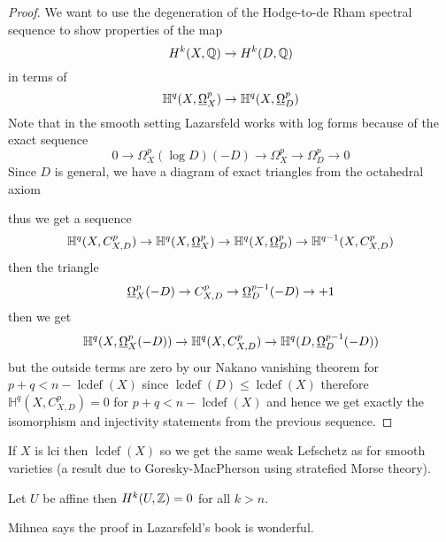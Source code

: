 \documentclass[12pt]{article}
\newcommand{\HH}{\mathbb{H}}
\DeclareMathOperator{\lcdef}{\mathrm{lcdef}}
\begin{document}
\begin{proof}
We want to use the degeneration of the Hodge-to-de Rham spectral sequence to show properties of the map
\[ H^k(X, \mathbb{Q}) \to H^k(D, \mathbb{Q}) \]
in terms of 
\[ \HH^q(X, \ulO_X^p) \to \HH^q(X, \ulO_D^p) \]
Note that in the smooth setting Lazarsfeld works with log forms because of the exact sequence
\[ 0 \to \Omega_X^p(\log{D})(-D) \to \Omega_X^p \to \Omega_D^p \to 0 \]
Since $D$ is general, we have a diagram of exact triangles from the octahedral axiom
\begin{center}
\end{center}
thus we get a sequence
\[ \HH^q(X, C_{X,D}^p) \to \HH^q(X, \ulO_X^p) \to \HH^q(X, \ulO_D^p) \to \HH^{q-1}(X, C_{X,D}^p) \]
then the triangle
\[ \underline{\Omega}_X^p(-D) \to C_{X,D}^p \to \underline{\Omega}_D^{p-1}(-D) \to +1 \]
then we get 
\[ \HH^q(X, \ulO_X^p(-D)) \to \HH^q(X, C_{X,D}^p) \to \HH^q(D, \ulO_D^{p-1}(-D)) \]
but the outside terms are zero by our Nakano vanishing theorem for $p + q < n - \lcdef(X)$ since $\lcdef(D) \le \lcdef(X)$ therefore $\HH^q(X, C_{X,D}^p) = 0$ for $p + q < n - \lcdef(X)$ and hence we get exactly the isomorphism and injectivity statements from the previous sequence. 
\end{proof}

\begin{example}
If $X$ is lci then $\lcdef(X)$ so we get the same weak Lefschetz as for smooth varieties (a result due to Goresky-MacPherson using stratefied Morse theory). 
\end{example}

\begin{theorem}[Artin]
Let $U$ be affine then $H^k(U, \mathbb{Z}) = 0$ for all $k > n$.
\end{theorem}

Mihnea says the proof in Lazarsfeld's book is wonderful. 
\end{document}

